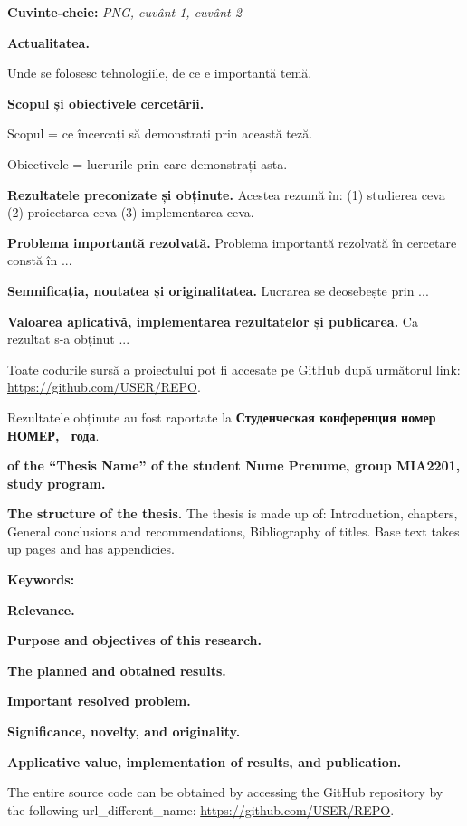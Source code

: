 \documentclass[a4paper,12pt]{report}
\newcommand{\uniGroupName}{MIA2201}
\newcommand{\authorName}{Nume Prenume}
\newcommand{\docTitleEng}{Thesis Name} %
\newcommand{\yearOfWriting}{\the\year}
\newcommand{\conferencesList}{Студенческая конференция номер НОМЕР, \yearOfWriting~года}
\newcommand{\github}{\url{https://github.com/USER/REPO}}
\begin{document}
\textbf{Cuvinte-cheie:}
\textit{\acrshort{PNG}, cuvânt 1, cuvânt 2}

\textbf{Actualitatea.}

Unde se folosesc tehnologiile, de ce e importantă temă.

\textbf{Scopul și obiectivele cercetării.}

Scopul = ce încercați să demonstrați prin această teză.

Obiectivele = lucrurile prin care demonstrați asta.

\textbf{Rezultatele preconizate și obținute.}
Acestea rezumă în:
(1) studierea ceva
(2) proiectarea ceva
(3) implementarea ceva.

\textbf{Problema importantă rezolvată.}
Problema importantă rezolvată în cercetare constă în ...

\textbf{Semnificația, noutatea și originalitatea.}
Lucrarea se deosebește prin ...

\textbf{Valoarea aplicativă, implementarea rezultatelor și publicarea.}
Ca rezultat s-a obținut ...

Toate codurile sursă a proiectului pot fi accesate pe GitHub după următorul link: \github.

Rezultatele obținute au fost raportate la \textbf{\conferencesList}\cite{self}.


\textbf{of the \docTypeEng{} \enquote{\docTitleEng{}} of the student \authorName{}, group \uniGroupName{}, \programulDeStudiiEng{} study program.}

\textbf{The structure of the thesis.}
The thesis is made up of: Introduction, \chapterCount{} chapters,
General conclusions and recommendations, Bibliography of \bibliographyEntryCount{} titles.
Base text takes up \usefulPageCount{} pages and has \anexeCount{} appendicies.

\textbf{Keywords:}
\textit{}

\textbf{Relevance.}

\textbf{Purpose and objectives of this research.}

\textbf{The planned and obtained results.}

\textbf{Important resolved problem.}

\textbf{Significance, novelty, and originality.}

\textbf{Applicative value, implementation of results, and publication.}

The entire source code can be obtained by accessing the GitHub repository
by the following \gls{url_different_name}: \github. 
\end{document}
